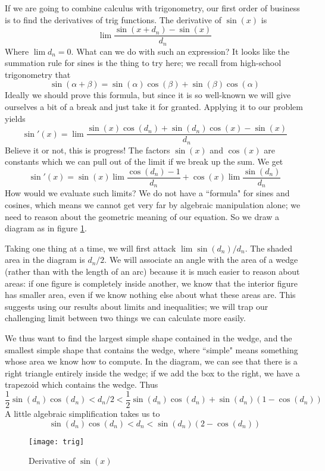 If we are going to combine calculus with trigonometry, our first order of business is to find the derivatives of trig functions. The derivative of $\sin(x)$ is
\[
\lim \frac{\sin(x+d_n)-\sin(x)}{d_n}
\]
Where $\lim d_n = 0$. What can we do with such an expression? It looks like the summation rule for sines is the thing to try here; we recall from high-school trigonometry that
\[
\sin(\alpha + \beta) = \sin(\alpha)\cos(\beta) + \sin(\beta)\cos(\alpha)
\]
Ideally we should prove this formula, but since it is so well-known we will give ourselves a bit of a break and just take it for granted. Applying  it to our problem yields
\[
\sin'(x) = \lim \frac{\sin(x)\cos(d_n) + \sin(d_n)\cos(x)-\sin(x)}{d_n}
\]
Believe it or not, this is progress! The factors $\sin(x)$ and $\cos(x)$ are constants which we can pull out of the limit if we break up the sum.  We get
\[
\sin'(x) = \sin(x)\lim \frac{\cos(d_n) - 1}{d_n} + \cos(x)\lim \frac{\sin(d_n)}{d_n}
\]
How would we evaluate such limits? We do not have a ``formula" for sines and cosines, which means we cannot get very far by algebraic manipulation alone; we need to reason about the geometric meaning of our equation. So we draw a diagram as in figure \ref{fig:sine}.

Taking one thing at a time, we will first attack $\lim \sin(d_n)/d_n$. The shaded area in the diagram is $d_n/2$. We will associate an angle with the area of a wedge (rather than with the length of an arc) because it is much easier to reason about areas: if one figure is completely inside another, we know that the interior figure has smaller area, even if we know nothing else about what these areas are. This suggests using our results about limits and inequalities; we will trap our challenging limit between two things we can calculate more easily.

We thus want to find the largest simple shape contained in the wedge, and the smallest simple shape that contains the wedge, where ``simple" means something whose area we know how to compute. In the diagram, we can see that there is a right triangle entirely inside the wedge; if we add the box to the right, we have a trapezoid which contains the wedge. Thus
\[
\frac{1}{2}\sin(d_n)\cos(d_n) < d_n/2 <  \frac{1}{2}\sin(d_n)\cos(d_n) + \sin(d_n)\left(1 - \cos(d_n)\right)
\]
A little algebraic simplification takes us to
\[
\sin(d_n)\cos(d_n) < d_n <   \sin(d_n)\left(2 - \cos(d_n)\right)
\]

\begin{figure}
\begin{center}
\texttt{[image: trig]}
\end{center}
\caption{Derivative of $\sin(x)$\label{fig:sine}}
\end{figure}


